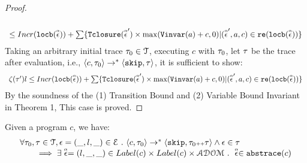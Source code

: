 \begin{proof}
\[\begin{array}{l}
\\
\leq 
Incr(\locbound(\absevent)) + 
\sum\{\absclr(\absevent') \times \max(\varinvar(a) + c, 0) | (\absevent', a, c) \in \reset(\locbound(\absevent))\} 
\end{array}
\]
  Taking an arbitrary initial trace
  $\trace_0 \in \mathcal{T}$, 
  executing $c$ with $\trace_0$, let $\trace$ be the trace after evaluation, i.e., $\config{{c}, \trace_0} \to^{*} \config{\eskip,\vtrace}$, it is sufficient to show:
  \[ 
    \begin{array}{l}
      \vcounter(\vtrace') l \leq 
    Incr(\locbound(\absevent)) + 
    \sum\{\absclr(\absevent') \times \max(\varinvar(a) + c, 0) | (\absevent', a, c) \in \reset(\locbound(\absevent))\}
  \end{array}
  \]
%
 By the soundness of the (1) Transition Bound and (2) Variable Bound Invariant 
 in \cite{sinn2017complexity} Theorem 1, 
This case is proved.
\end{proof}
%
\begin{lem}
  \label{lem:abscfg_sound}
Given a program ${c}$, we have:
%
\[
  \begin{array}{l}
    \forall \vtrace_0, \trace \in \mathcal{T} ,  \event = (\_, l, \_) \in \eventset \st
\config{{c}, \trace_0} \to^{*} \config{\eskip, \trace_0 \tracecat \vtrace} 
\land \event \in \trace 
\\
\qquad \implies \exists \absevent = (l, \_, \_) \in Label(c) \times Label(c) \times \absdom \st 
\absevent \in \absflow(c)
\end{array}
\]
\end{lem}
